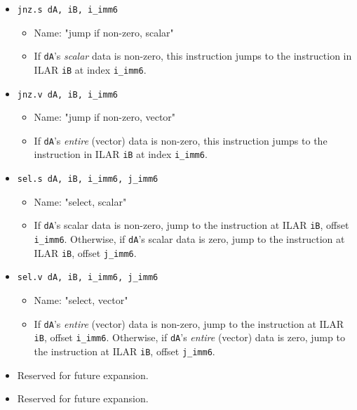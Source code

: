\documentclass{article}
\begin{document}
\begin{itemize}
			\item \texttt{jnz.s dA, iB, i\_imm6}
				\begin{itemize}
				\item Name:  "jump if non-zero, scalar"
				\item If \texttt{dA}'s \textit{scalar} data is non-zero,
					this instruction jumps to the instruction in ILAR
					\texttt{iB} at index \texttt{i\_imm6}.
				\end{itemize}
			\item \texttt{jnz.v dA, iB, i\_imm6}
				\begin{itemize}
				\item Name:  "jump if non-zero, vector"
				\item If \texttt{dA}'s \textit{entire} (vector) data is
					non-zero, this instruction jumps to the instruction in
					ILAR \texttt{iB} at index \texttt{i\_imm6}.
				\end{itemize}

			\item \texttt{sel.s dA, iB, i\_imm6, j\_imm6}
				\begin{itemize}
				\item Name:  "select, scalar"
				\item If \texttt{dA}'s scalar data is non-zero, jump to the
					instruction at ILAR \texttt{iB}, offset
					\texttt{i\_imm6}.  Otherwise, if \texttt{dA}'s scalar
					data is zero, jump to the instruction at ILAR
					\texttt{iB}, offset \texttt{j\_imm6}.
				\end{itemize}

			\item \texttt{sel.v dA, iB, i\_imm6, j\_imm6}
				\begin{itemize}
				\item Name:  "select, vector"
				\item If \texttt{dA}'s \textit{entire} (vector) data is
					non-zero, jump to the instruction at ILAR \texttt{iB},
					offset \texttt{i\_imm6}.  Otherwise, if \texttt{dA}'s
					\textit{entire} (vector) data is zero, jump to the
					instruction at ILAR \texttt{iB}, offset
					\texttt{j\_imm6}.
				\end{itemize}

			\item Reserved for future expansion.
			\item Reserved for future expansion.
		\end{itemize}


\end{document}
